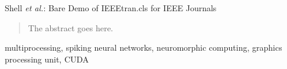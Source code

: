 \documentclass[journal]{IEEEtran}
\begin{document}
%
{Shell \MakeLowercase{\textit{et al.}}: Bare Demo of IEEEtran.cls for IEEE Journals}
% 










\maketitle



\begin{abstract}
The abstract goes here.
\end{abstract}

\begin{IEEEkeywords}
multiprocessing, spiking neural networks, neuromorphic computing, graphics processing unit, CUDA
\end{IEEEkeywords}





%
\IEEEpeerreviewmaketitle
\end{document}
